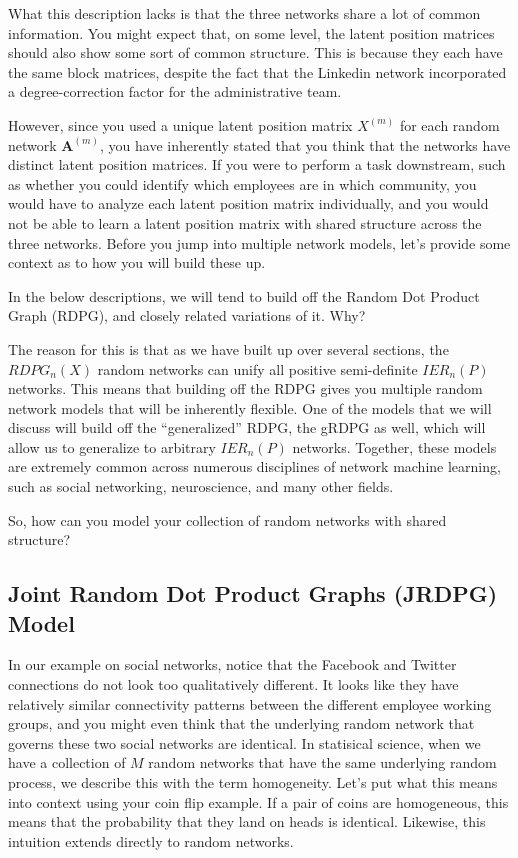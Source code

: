 What this description lacks is that the three networks share a {lot} of common information. You might expect that, on some level, the latent position matrices should also show some sort of common structure. This is because they each have the same block matrices, despite the fact that the Linkedin network incorporated a degree-correction factor for the administrative team.

However, since you used a {unique} latent position matrix $X^{(m)}$ for each random network $\mathbf A^{(m)}$, you have inherently stated that you think that the networks have distinct latent position matrices. If you were to perform a task downstream, such as whether you could identify which employees are in which community, you would have to analyze each latent position matrix individually, and you would not be able to learn a latent position matrix with shared structure across the three networks. Before you jump into multiple network models, let's provide some context as to how you will build these up.

In the below descriptions, we will tend to build off the Random Dot Product Graph (RDPG), and closely related variations of it. Why?

The reason for this is that as we have built up over several sections, the $RDPG_n(X)$ random networks can unify all positive semi-definite $IER_n(P)$ networks. This means that building off the RDPG gives you multiple random network models that will be inherently flexible. One of the models that we will discuss will build off the ``generalized'' RDPG, the gRDPG \cite{Rubin2022Sep,Arroyo2021} as well, which will allow us to generalize to arbitrary $IER_n(P)$ networks. Together, these models are extremely common across numerous disciplines of network machine learning, such as social networking, neuroscience, and many other fields.

So, how can you model your collection of random networks with shared structure?
\subsection{Joint Random Dot Product Graphs (JRDPG) Model}
\label{sec:ch5:multi:jrdpg}
In our example on social networks, notice that the Facebook and Twitter connections do not look {too} qualitatively different. It looks like they have relatively similar connectivity patterns between the different employee working groups, and you might even think that the underlying random network that governs these two social networks are {identical}. In statisical science, when we have a collection of $M$ random networks that have the same underlying random process, we describe this with the term {homogeneity}. Let's put what this means into context using your coin flip example. If a pair of coins are {homogeneous}, this means that the probability that they land on heads is identical. Likewise, this intuition extends directly to random networks. 

